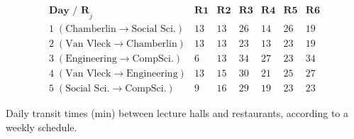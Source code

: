 \begin{table}[ht]
\centering
\renewcommand{\arraystretch}{1.15}
\[
\begin{array}{c|rrrrrr}
\textbf{Day / R}_j & \mathbf{R1} & \mathbf{R2} & \mathbf{R3} & \mathbf{R4} & \mathbf{R5} & \mathbf{R6} \\ \hline
1\;(\text{Chamberlin}\!\rightarrow\!\text{Social Sci.})      & 13 & 13 & 26 & 14 & 26 & 19 \\
2\;(\text{Van Vleck}\!\rightarrow\!\text{Chamberlin})        & 13 & 13 & 23 & 13 & 23 & 19 \\
3\;(\text{Engineering}\!\rightarrow\!\text{CompSci.})        & 6  & 13 & 34 & 27 & 23 & 34 \\
4\;(\text{Van Vleck}\!\rightarrow\!\text{Engineering})       & 13 & 15 & 30 & 21 & 25 & 27 \\
5\;(\text{Social Sci.}\!\rightarrow\!\text{CompSci.})        & 9  & 16 & 29 & 19 & 23 & 23
\end{array}
\]
\caption{Daily transit times (min) between lecture halls and restaurants, according to a weekly schedule. }
\label{tab:transit}
\end{table}